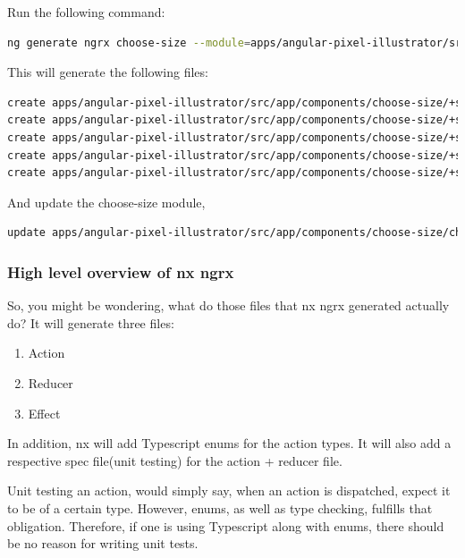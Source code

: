 Run the following command:
\begin{lstlisting}[language=Bash]
ng generate ngrx choose-size --module=apps/angular-pixel-illustrator/src/app/components/choose-size/choose-size.module.ts
\end{lstlisting}

This will generate the following files:
\begin{lstlisting}[language=Bash]
create apps/angular-pixel-illustrator/src/app/components/choose-size/+state/choose-size.actions.ts (684 bytes)
create apps/angular-pixel-illustrator/src/app/components/choose-size/+state/choose-size.reducer.ts (869 bytes)
create apps/angular-pixel-illustrator/src/app/components/choose-size/+state/choose-size.effects.ts (859 bytes)
create apps/angular-pixel-illustrator/src/app/components/choose-size/+state/choose-size.effects.spec.ts (1070 bytes)
create apps/angular-pixel-illustrator/src/app/components/choose-size/+state/choose-size.reducer.spec.ts (364 bytes)
\end{lstlisting}
And update the choose-size module,
\begin{lstlisting}[language=Bash]
update apps/angular-pixel-illustrator/src/app/components/choose-size/choose-size.module.ts
\end{lstlisting}

\subsubsection{ High level overview of nx ngrx }
So, you might be wondering, what do those files that nx ngrx generated actually
do? It will generate three files:
\begin{enumerate}
  \item Action
  \item Reducer
  \item Effect
\end{enumerate}

In addition, nx will add Typescript enums for the action types. It will also
add a respective spec file(unit testing) for the action + reducer file.

\colorbox{darkgray}{\color{white}{Unit testing Actions?}}

Unit testing an action, would simply say, when an action is dispatched, expect
it to be of a certain type. However, enums, as well as type checking, fulfills
that obligation. Therefore, if one is using Typescript along with enums, there
should be no reason for writing unit tests.

